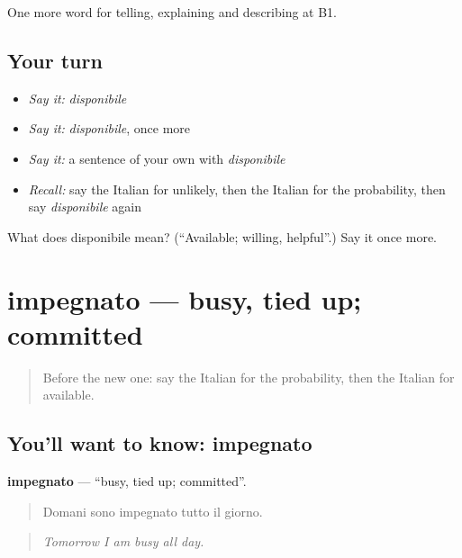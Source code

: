\begin{grammarlens}[title={What you've built}]
One more word for telling, explaining and describing at B1.
\end{grammarlens}

\subsection*{Your turn}
\begin{itemize}
\raggedright
  \item \emph{Say it:} \emph{disponibile}
  \item \emph{Say it:} \emph{disponibile}, once more
  \item \emph{Say it:} a sentence of your own with \emph{disponibile}
  \item \emph{Recall:} say the Italian for unlikely, then the Italian for the probability, then say \emph{disponibile} again
\end{itemize}

\begin{tcolorbox}[breakable,colback=teal!4,colframe=teal!35!black,title={Before you move on}]
What does disponibile mean? (\textquotedblleft{}Available; willing, helpful\textquotedblright{}.) Say it once more.
\end{tcolorbox}
\section[impegnato]{impegnato — busy, tied up; committed}

\label{lesson:IT-C377-impegnato}



\begin{quote}
Before the new one: say the Italian for the probability, then the Italian for available.
\end{quote}

\subsection*{You'll want to know: impegnato}
\textbf{impegnato} — \textquotedblleft{}busy, tied up; committed\textquotedblright{}.

\begin{quote}
Domani sono impegnato tutto il giorno.
\end{quote}

\begin{quote}
\emph{Tomorrow I am busy all day.}
\end{quote}

